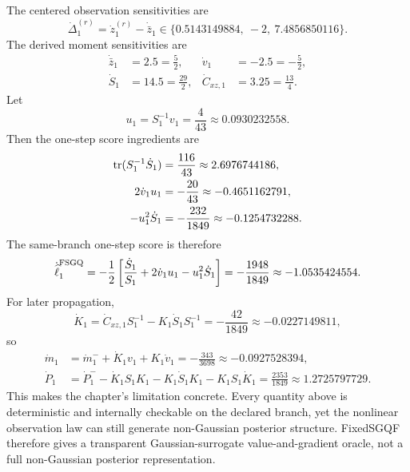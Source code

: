 The centered observation sensitivities are
\begin{equation}
  \dot\Delta_1^{(r)}=\dot z_1^{(r)}-\dot{\bar z}_1
  \in
  \{0.5143149884,\ -2,\ 7.4856850116\}.
  \label{eq:bf-hd-sgqf-example-Deltadot}
\end{equation}
The derived moment sensitivities are
\begin{align}
  \dot{\bar z}_1&=2.5=\frac52,
  &\dot v_1&=-2.5=-\frac52,
  \label{eq:bf-hd-sgqf-example-zbar-v-dot}\\
  \dot S_1&=14.5=\frac{29}{2},
  &\dot C_{xz,1}&=3.25=\frac{13}{4}.
  \label{eq:bf-hd-sgqf-example-S-Cxz-dot}
\end{align}
Let
\begin{equation}
  u_1=S_1^{-1}v_1=\frac{4}{43}\approx0.0930232558.
  \label{eq:bf-hd-sgqf-example-u}
\end{equation}
Then the one-step score ingredients are
\begin{align}
  \operatorname{tr}(S_1^{-1}\dot S_1)&=\frac{116}{43}\approx2.6976744186,
  \label{eq:bf-hd-sgqf-example-score-term1}\\
  2\dot v_1u_1&=-\frac{20}{43}\approx-0.4651162791,
  \label{eq:bf-hd-sgqf-example-score-term2}\\
  -u_1^2\dot S_1&=-\frac{232}{1849}\approx-0.1254732288.
  \label{eq:bf-hd-sgqf-example-score-term3}
\end{align}
The same-branch one-step score is therefore
\begin{equation}
  \dot{\widehat\ell}_1^{\rm FSGQ}
  =
  -\frac12\left[
    \frac{\dot S_1}{S_1}
    +2\dot v_1u_1
    -u_1^2\dot S_1
  \right]
  =-\frac{1948}{1849}
  \approx -1.0535424554.
  \label{eq:bf-hd-sgqf-example-ell-dot}
\end{equation}
For later propagation,
\begin{equation}
  \dot K_1
  =
  \dot C_{xz,1}S_1^{-1}-K_1\dot S_1S_1^{-1}
  =-\frac{42}{1849}
  \approx -0.0227149811,
  \label{eq:bf-hd-sgqf-example-Kdot}
\end{equation}
so
\begin{align}
  \dot m_1&=\dot m_1^-+\dot K_1v_1+K_1\dot v_1
  =-\frac{343}{3698}
  \approx -0.0927528394,
  \label{eq:bf-hd-sgqf-example-mdot}\\
  \dot P_1&=\dot P_1^- -\dot K_1S_1K_1-K_1\dot S_1K_1-K_1S_1\dot K_1
  =\frac{2353}{1849}
  \approx 1.2725797729.
  \label{eq:bf-hd-sgqf-example-Pdot}
\end{align}
This makes the chapter's limitation concrete.  Every quantity above is
deterministic and internally checkable on the declared branch, yet the nonlinear
observation law can still generate non-Gaussian posterior structure.  FixedSGQF
therefore gives a transparent Gaussian-surrogate value-and-gradient oracle, not a
full non-Gaussian posterior representation.

